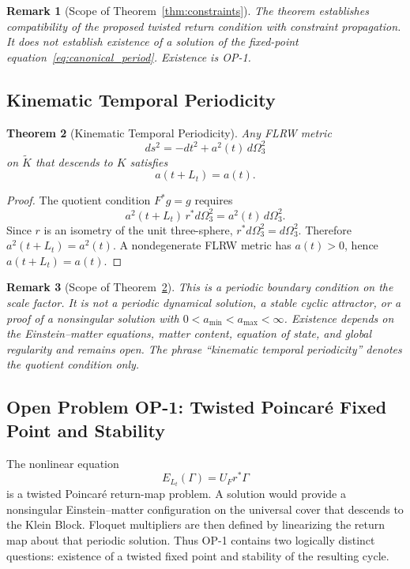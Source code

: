 \documentclass[11pt]{article}
\theoremstyle{canonmath}
\newtheorem{theorem}{Theorem}[section]
\newtheorem{remark}[theorem]{Remark}
\theoremstyle{canonpostulate}
\theoremstyle{canonclaim}
\providecommand{\Klein}{\mathcal{K}}
\def\mathcal#1{#1}%
\begin{document}
\begin{remark}[Scope of Theorem~\ref{thm:constraints}]
The theorem establishes compatibility of the proposed twisted return condition with constraint propagation. It does not establish existence of a solution of the fixed-point equation~\eqref{eq:canonical_period}. Existence is OP-1.
\end{remark}

\subsection{Kinematic Temporal Periodicity}

\begin{theorem}[Kinematic Temporal Periodicity] \label{thm:cyclic}
Any FLRW metric
\begin{equation}
ds^2=-dt^2+a^2(t)\,d\Omega_3^2
\end{equation}
on $\widetilde{\Klein}$ that descends to $\Klein$ satisfies
\begin{equation}
a(t+L_t)=a(t).
\end{equation}
\end{theorem}
\begin{proof}
The quotient condition $F^*g=g$ requires
\begin{equation}
a^2(t+L_t)\,r^*d\Omega_3^2=a^2(t)\,d\Omega_3^2.
\end{equation}
Since $r$ is an isometry of the unit three-sphere, $r^*d\Omega_3^2=d\Omega_3^2$. Therefore $a^2(t+L_t)=a^2(t)$. A nondegenerate FLRW metric has $a(t)>0$, hence $a(t+L_t)=a(t)$.
\end{proof}

\begin{remark}[Scope of Theorem~\ref{thm:cyclic}]
This is a periodic boundary condition on the scale factor. It is not a periodic dynamical solution, a stable cyclic attractor, or a proof of a nonsingular solution with $0<a_{\min}<a_{\max}<\infty$. Existence depends on the Einstein--matter equations, matter content, equation of state, and global regularity and remains open. The phrase ``kinematic temporal periodicity'' denotes the quotient condition only.
\end{remark}

\subsection{Open Problem OP-1: Twisted Poincar\'e Fixed Point and Stability}

The nonlinear equation
\begin{equation}
\mathcal E_{L_t}(\Gamma)=U_F r^*\Gamma
\end{equation}
is a twisted Poincar\'e return-map problem. A solution would provide a nonsingular Einstein--matter configuration on the universal cover that descends to the Klein Block. Floquet multipliers are then defined by linearizing the return map about that periodic solution. Thus OP-1 contains two logically distinct questions: existence of a twisted fixed point and stability of the resulting cycle.
\end{document}

